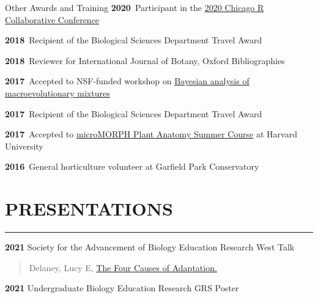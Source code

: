 \documentclass[]{resume}
\begin{document}


\begin{rSection}{Other Awards and Training}
\textbf{2020}\ Participant in the
\href{https://chircollab.github.io/}{2020 Chicago R Collaborative Conference}

\textbf{2018}\ Recipient of the Biological Sciences Department Travel
Award

\textbf{2018}\ Reviewer for International Journal of Botany, Oxford
Bibliographies

\textbf{2017}\ Accepted to NSF-funded workshop on
\href{http://bamm-project.org/index.html}{Bayesian analysis of macroevolutionary mixtures}

\textbf{2017}\ Recipient of the Biological Sciences Department Travel
Award

\textbf{2017}\ Accepted to
\href{https://web.archive.org/web/20170922060558/http://arboretum.harvard.edu/tracing-evolution-form-function/}{microMORPH Plant Anatomy Summer Course}
at Harvard University

\textbf{2016}\ General horticulture volunteer at Garfield Park
Conservatory

\end{rSection}


\hypertarget{presentations}{%
\section{PRESENTATIONS}\label{presentations}}

\hrule

\textbf{2021} Society for the Advancement of Biology Education Research
West \hspace{1mm}\textbar{}\hspace{1mm} Talk \vspace{-0.25cm}

\begin{quote}Delaney, Lucy E, \href{https://ledelaney.org/talks/sabertalk/SABER-slides.html}{The Four Causes of Adaptation.}\end{quote}

\textbf{2021} Undergraduate Biology Education Research GRS
\hspace{1mm}\textbar{}\hspace{1mm} Poster \vspace{-0.25cm}
\end{document}
